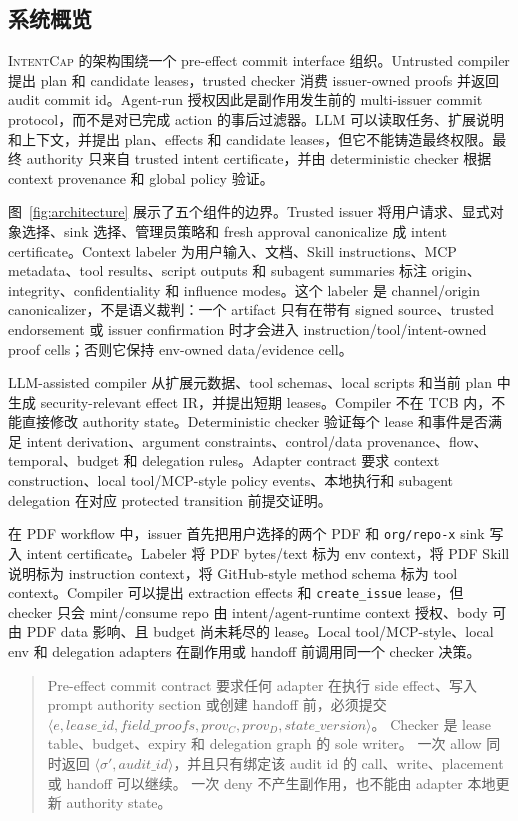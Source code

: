 \documentclass[UTF8,a4paper,11pt]{ctexart}
\newcommand{\sys}{\textsc{IntentCap}\xspace}
\begin{document}
\subsection{系统概览}

\sys 的架构围绕一个 pre-effect commit interface 组织。Untrusted compiler 提出 plan 和 candidate leases，trusted checker 消费 issuer-owned proofs 并返回 audit commit id。Agent-run 授权因此是副作用发生前的 multi-issuer commit protocol，而不是对已完成 action 的事后过滤器。LLM 可以读取任务、扩展说明和上下文，并提出 plan、effects 和 candidate leases，但它不能铸造最终权限。最终 authority 只来自 trusted intent certificate，并由 deterministic checker 根据 context provenance 和 global policy 验证。

图~\ref{fig:architecture} 展示了五个组件的边界。Trusted issuer 将用户请求、显式对象选择、sink 选择、管理员策略和 fresh approval canonicalize 成 intent certificate。Context labeler 为用户输入、文档、Skill instructions、MCP metadata、tool results、script outputs 和 subagent summaries 标注 origin、integrity、confidentiality 和 influence modes。这个 labeler 是 channel/origin canonicalizer，不是语义裁判：一个 artifact 只有在带有 signed source、trusted endorsement 或 issuer confirmation 时才会进入 instruction/tool/intent-owned proof cells；否则它保持 env-owned data/evidence cell。

LLM-assisted compiler 从扩展元数据、tool schemas、local scripts 和当前 plan 中生成 security-relevant effect IR，并提出短期 leases。Compiler 不在 TCB 内，不能直接修改 authority state。Deterministic checker 验证每个 lease 和事件是否满足 intent derivation、argument constraints、control/data provenance、flow、temporal、budget 和 delegation rules。Adapter contract 要求 context construction、local tool/MCP-style policy events、本地执行和 subagent delegation 在对应 protected transition 前提交证明。

在 PDF workflow 中，issuer 首先把用户选择的两个 PDF 和 \texttt{org/repo-x} sink 写入 intent certificate。Labeler 将 PDF bytes/text 标为 env context，将 PDF Skill 说明标为 instruction context，将 GitHub-style method schema 标为 tool context。Compiler 可以提出 extraction effects 和 \texttt{create\_issue} lease，但 checker 只会 mint/consume repo 由 intent/agent-runtime context 授权、body 可由 PDF data 影响、且 budget 尚未耗尽的 lease。Local tool/MCP-style、local env 和 delegation adapters 在副作用或 handoff 前调用同一个 checker 决策。

\begin{quote}
\small
Pre-effect commit contract 要求任何 adapter 在执行 side effect、写入 prompt authority section 或创建 handoff 前，必须提交
\(\langle e, lease\_id, field\_proofs, prov_C, prov_D, state\_version\rangle\)。
Checker 是 lease table、budget、expiry 和 delegation graph 的 sole writer。
一次 allow 同时返回 \(\langle\sigma', audit\_id\rangle\)，并且只有绑定该 audit id 的 call、write、placement 或 handoff 可以继续。
一次 deny 不产生副作用，也不能由 adapter 本地更新 authority state。
\end{quote}
\end{document}
